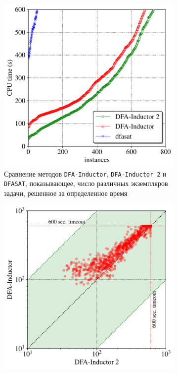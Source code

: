 \begin{figure}[ht]
  \centering
  \begin{subfigure}[b]{0.48\textwidth}
    \centering
    \includegraphics[width=\textwidth]{img/lata19/plots/cactus}
    \caption{Сравнение методов \texttt{DFA-Inductor}, \texttt{DFA-Inductor~2} и \texttt{DFASAT}, показывающее, число различных экземпляров задачи, решенное за определенное время}
    \label{img:plots:cactus}
  \end{subfigure}%
  \;\;
  \begin{subfigure}[b]{0.48\textwidth}
    \centering
    \includegraphics[width=\textwidth]{img/lata19/plots/scatter}

\end{subfigure}
\end{figure}
